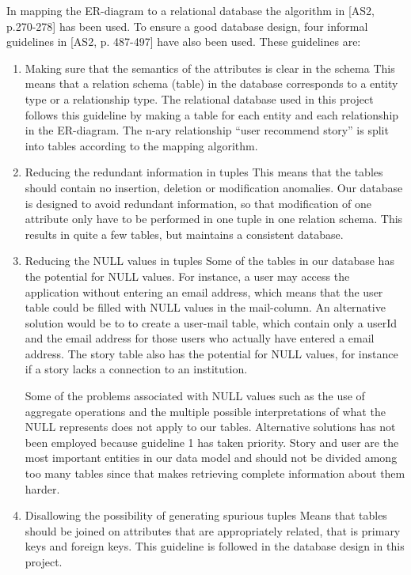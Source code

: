 In mapping the ER-diagram to a relational database the algorithm in [AS2, p.270-278] has been used. To ensure a good database design, four informal guidelines in [AS2, p. 487-497] have also been used. These guidelines are:
\begin{enumerate}
\item Making sure that the semantics of the attributes is clear in the schema\newline 
	This means that a relation schema (table) in the database corresponds to a entity type or a relationship type. The relational database used in this project follows this guideline by making a table for each entity and each relationship in the ER-diagram. The n-ary relationship “user recommend story” is split into tables according to the mapping algorithm.
\item Reducing the redundant information in tuples\newline
	This means that the tables should contain no insertion, deletion or modification anomalies. Our database is designed to avoid redundant information, so that modification of one attribute only have to be performed in one tuple in one relation schema. This results in quite a few tables, but maintains a consistent database.
\item Reducing the NULL values in tuples\newline
	Some of the tables in our database has the potential for NULL values. For instance, a user may access the application without entering an email address, which means that the user table could be filled with NULL values in the mail-column. An alternative solution would be to to create a user-mail table, which contain only a userId and the email address for those users who actually have entered a email address. The story table also has the potential for NULL values, for instance if a story lacks a connection to an institution.\newline
	
	Some of the problems associated with NULL values such as the use of aggregate operations and the multiple possible interpretations of what the NULL represents does not apply to our tables. Alternative solutions has not been employed because guideline 1 has taken priority. Story and user are the most important entities in our data model and should not be divided among too many tables since that makes retrieving complete information about them harder. 
\item Disallowing the possibility of generating spurious tuples \newline
	Means that tables should be joined on attributes that are appropriately related, that is primary keys and foreign keys. This guideline is followed in the database design in this project. 
\end{enumerate}

